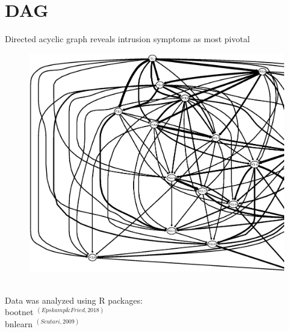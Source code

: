 \documentclass[]{betterposter}
\begin{document}
{\section{DAG}
\begin{center}
Directed acyclic graph reveals intrusion symptoms as most pivotal
\begin{figure}
    \centering
    \includegraphics[width=\textwidth]{img/pcl_DAG.eps}
    \label{fig:my_label}
\end{figure}
\end{center}

\\
Data was analyzed using R packages: \\
bootnet $^{(Epskamp \& Fried, 2018)}$ \\
bnlearn $^{(Scutari, 2009)}$

\vfill

\begin{flushright}


\end{flushright}}
\end{document}
